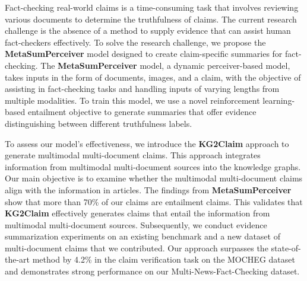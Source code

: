 Fact-checking real-world claims is a time-consuming task that involves reviewing various documents to determine the truthfulness of claims. The current research challenge is the absence of a method to supply evidence that can assist human fact-checkers effectively. To solve the research challenge, we propose the \textbf{MetaSumPerceiver} model designed to create claim-specific summaries for fact-checking. The \textbf{MetaSumPerceiver} model, a dynamic perceiver-based model, takes inputs in the form of documents, images, and a claim, with the objective of assisting in fact-checking tasks and handling inputs of varying lengths from multiple modalities. To train this model, we use a novel reinforcement learning-based entailment objective to generate summaries that offer evidence distinguishing between different truthfulness labels.

To assess our model's effectiveness, we introduce the \textbf{KG2Claim} approach to generate multimodal multi-document claims. This approach integrates information from multimodal multi-document sources into the knowledge graphs. Our main objective is to examine whether the multimodal multi-document claims align with the information in articles. The findings from \textbf{MetaSumPerceiver} show that more than 70\% of our claims are entailment claims. This validates that \textbf{KG2Claim} effectively generates claims that entail the information from multimodal multi-document sources. Subsequently, we conduct evidence summarization experiments on an existing benchmark and a new dataset of multi-document claims that we contributed. Our approach surpasses the state-of-the-art method by 4.2\% in the claim verification task on the MOCHEG dataset and demonstrates strong performance on our Multi-News-Fact-Checking dataset.


